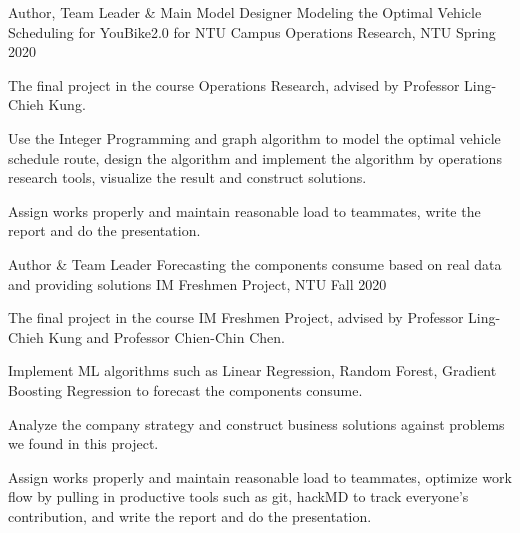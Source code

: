 

\begin{cventries}

  \cventry
    {Author, Team Leader \& Main Model Designer} %
    {Modeling the Optimal Vehicle Scheduling for YouBike2.0 for NTU Campus} %
    {Operations Research, NTU} %
    {Spring 2020} %
    {
      \begin{cvitems} %
        \item {The final project in the course Operations Research, advised by Professor Ling-Chieh Kung.}
        \item {Use the Integer Programming and graph algorithm to model the optimal vehicle schedule route, design the algorithm and implement the algorithm by operations research tools, visualize the result and construct solutions.}
        \item {Assign works properly and maintain reasonable load to teammates, write the report and do the presentation.}
      \end{cvitems}
    }

  \cventry
    {Author \& Team Leader} %
    {Forecasting the components consume based on real data and providing solutions} %
    {IM Freshmen Project, NTU} %
    {Fall 2020} %
    {
      \begin{cvitems} %
      \item {The final project in the course IM Freshmen Project, advised by Professor Ling-Chieh Kung and Professor Chien-Chin Chen.}
        \item {Implement ML algorithms such as Linear Regression, Random Forest, Gradient Boosting Regression to forecast the components consume.}
        \item {Analyze the company strategy and construct business solutions against problems we found in this project.}
        \item {Assign works properly and maintain reasonable load to teammates, optimize work flow by pulling in productive tools such as git, hackMD to track everyone's contribution, and write the report and do the presentation.}
      \end{cvitems}
    }


\end{cventries}
